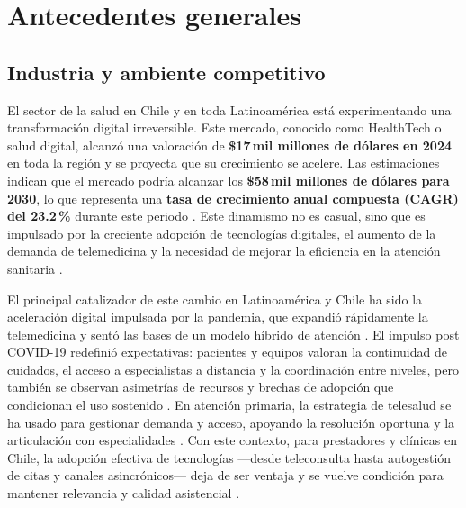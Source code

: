 %
%




\section{Antecedentes generales}
\subsection{Industria y ambiente competitivo}


El sector de la salud en Chile y en toda Latinoamérica está experimentando una transformación digital irreversible. Este mercado, conocido como HealthTech o salud digital, alcanzó una valoración de \textbf{\$17\,mil millones de dólares en 2024} en toda la región y se proyecta que su crecimiento se acelere. Las estimaciones indican que el mercado podría alcanzar los \textbf{\$58\,mil millones de dólares para 2030}, lo que representa una \textbf{tasa de crecimiento anual compuesta (CAGR) del 23.2\,\%} durante este periodo \citep{GrandViewResearch2024}. Este dinamismo no es casual, sino que es impulsado por la creciente adopción de tecnologías digitales, el aumento de la demanda de telemedicina y la necesidad de mejorar la eficiencia en la atención sanitaria \citep{MordorIntelligence2025}.


El principal catalizador de este cambio en Latinoamérica y Chile ha sido la aceleración digital impulsada por la pandemia, que expandió rápidamente la telemedicina y sentó las bases de un modelo híbrido de atención \citep{SuperSalud2025}. El impulso post COVID-19 redefinió expectativas: pacientes y equipos valoran la continuidad de cuidados, el acceso a especialistas a distancia y la coordinación entre niveles, pero también se observan asimetrías de recursos y brechas de adopción que condicionan el uso sostenido \citep{RevChilSalud2025}. En atención primaria, la estrategia de telesalud se ha usado para gestionar demanda y acceso, apoyando la resolución oportuna y la articulación con especialidades \citep{PanAmPubHealth2024}. Con este contexto, para prestadores y clínicas en Chile, la adopción efectiva de tecnologías —desde teleconsulta hasta autogestión de citas y canales asincrónicos— deja de ser ventaja y se vuelve condición para mantener relevancia y calidad asistencial \citep{SuperSalud2025}.

